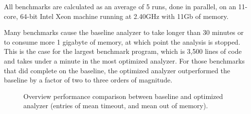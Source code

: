 \documentclass[preprint,onecolumn,9pt]{sigplanconf} %
\begin{document}
All benchmarks are calculated as an average of 5 runs, done in
parallel, on an 11-core, 64-bit Intel Xeon machine running at 2.40GHz
with 11Gb of memory.

Many benchmarks cause the baseline analyzer to take longer than 30
minutes or to consume more 1 gigabyte of memory, at which point the
analysis is stopped.  This is the case for the largest benchmark
program, which is 3,500 lines of code and takes under a minute in the
most optimized analyzer.  For those benchmarks that did complete on
the baseline, the optimized analyzer outperformed the baseline by a
factor of two to three orders of magnitude.

\begin{figure}
\centering

\caption{Overview performance comparison between baseline and
  optimized analyzer (entries of  mean timeout, and  mean out of memory).}
\label{fig:bench-overview}
\end{figure}
\end{document}

